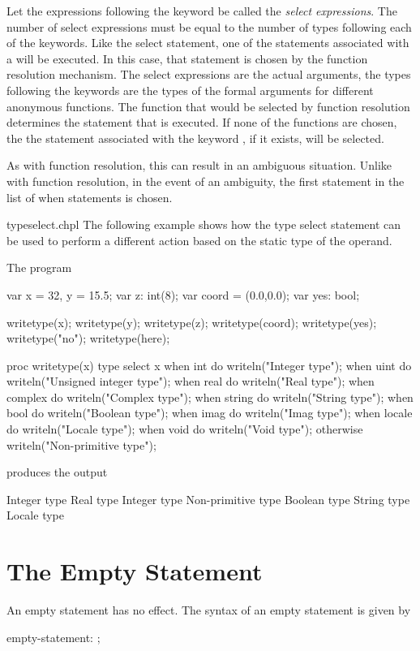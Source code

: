 Let the expressions following the keyword  be called the 
\emph{select expressions}.  The number of select expressions must be equal to the
number of types following each of the  keywords.  Like the
select statement, one of the statements associated with a 
will be executed.  In this case, that statement is chosen by the
function resolution mechanism.  The select expressions are the actual
arguments, the types following the  keywords are the types
of the formal arguments for different anonymous functions.  The
function that would be selected by function resolution determines the
statement that is executed.  If none of the functions are chosen, the
the statement associated with the keyword , if it
exists, will be selected.

As with function resolution, this can result in an ambiguous
situation.  Unlike with function resolution, in the event of an
ambiguity, the first statement in the list of when statements is
chosen.

\begin{chapelexample}{typeselect.chpl}
The following example shows how the type select statement can be used to perform
a different action based on the static type of the operand.

The program
\begin{chapel}
var x = 32, y = 15.5; 
var z: int(8);
var coord = (0.0,0.0);
var yes: bool;

writetype(x);
writetype(y);
writetype(z);
writetype(coord);
writetype(yes);
writetype("no");
writetype(here);

proc writetype(x) {
  type select x {
    when int do writeln("Integer type");
    when uint do writeln("Unsigned integer type");
    when real do writeln("Real type");
    when complex do writeln("Complex type");
    when string do writeln("String type");
    when bool do writeln("Boolean type");
    when imag do writeln("Imag type");
    when locale do writeln("Locale type");
    when void do writeln("Void type");
    otherwise writeln("Non-primitive type");
  }
}
\end{chapel}
produces the output
\begin{chapelprintoutput}{}
Integer type
Real type
Integer type
Non-primitive type
Boolean type
String type
Locale type
\end{chapelprintoutput}
\end{chapelexample}

\section{The Empty Statement}
\label{The_Empty_Statement}

An empty statement has no effect.  The syntax of an empty statement is
given by
\begin{syntax}
empty-statement:
  ;
\end{syntax}
